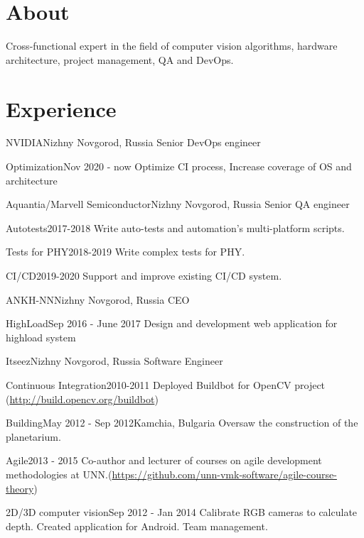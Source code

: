 \documentclass[12pt,a4paper]{moderncv}
\begin{document}
\maketitle

\section{About}
Cross-functional expert in the field of computer vision algorithms, hardware architecture, project management, QA and DevOps.

\section{Experience}
	{NVIDIA}{Nizhny Novgorod, Russia}{}{}
	{Senior DevOps engineer}

\cventry{}
	{Optimization}{Nov 2020 - now}{}{}
	{Optimize CI process, Increase coverage of OS and architecture}

	{Aquantia/Marvell Semiconductor}{Nizhny Novgorod, Russia}{}{}
	{Senior QA engineer}

\cventry{}
	{Autotests}{2017-2018}{}{}
	{Write auto-tests and automation's multi-platform scripts.}

\cventry{}
	{Tests for PHY}{2018-2019}{}{}
	{Write complex tests for PHY.}

\cventry{}
	{CI/CD}{2019-2020}{}{}
	{Support and improve existing CI/CD system.}

	{ANKH-NN}{Nizhny Novgorod, Russia}{}{}
	{CEO}

\cventry{}
	{HighLoad}{Sep 2016 - June 2017}{}{}
	{Design and development web application for highload system}

	{Itseez}{Nizhny Novgorod, Russia}{}{}
	{Software Engineer}

\cventry{}
	{Continuous Integration}{2010-2011}{}{}
	{Deployed Buildbot for OpenCV project (\url{http://build.opencv.org/buildbot})}

\cventry{}
	{Building}{May 2012 - Sep 2012}{Kamchia, Bulgaria}{}
	{Oversaw the construction of the planetarium.}

\cventry{}
	{Agile}{2013 - 2015}{}{}
	{Co-author and lecturer of courses on agile development methodologies at UNN.\newline(\url{https://github.com/unn-vmk-software/agile-course-theory})}


\cventry{}
	{2D/3D computer vision}{Sep 2012 - Jan 2014}{} {}
	{Calibrate RGB cameras to calculate depth. Created application for Android. Team management.}
\end{document}

